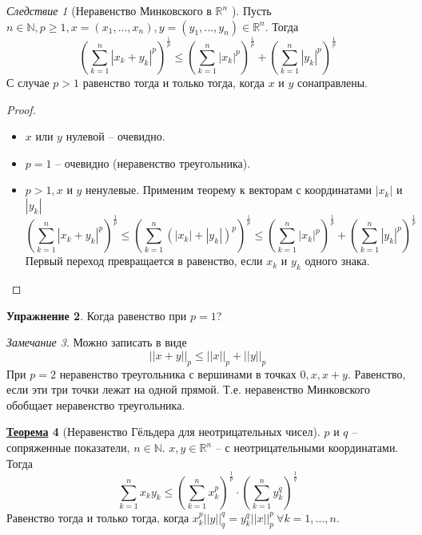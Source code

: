 \documentclass[12pt]{article}
\newenvironment{MyItemize}[1][4pt]{
  \begin{itemize}
  \setlength{\parskip}{0pt}
  \setlength{\itemsep}{#1}
}{       
  \end{itemize}
}
\def\N{\mathbb{N}}       %
\def\R{\mathbb{R}}       %
\theoremstyle{definition} %
\newtheorem{Thm}{\underline{Теорема}}[subsection] %
\newtheorem{Ex}[Thm]{Упражнение} %
\theoremstyle{plain} %
\theoremstyle{remark} %
\newtheorem{Cons}[Thm]{Следствие} %
\newtheorem{Rem}[Thm]{Замечание} %
\begin{document}
\begin{Cons}[Неравенство Минковского в $\R^n$ ]
    Пусть $n \in \N, p \geqslant 1, x = (x_1, ..., x_n), y = (y_1, ..., y_n) \in \R^n$.
    Тогда
    \[\left(\sum_{k=1}^{n} |x_k + y_k|^p\right)^{\frac{1}{p}} \leqslant \left(\sum_{k = 1}^n |x_k|^p\right)^{\frac{1}{p}} + \left(\sum_{k=1}^{n} |y_k|^p\right)^{\frac{1}{p}}\]
    С случае $p > 1$ равенство тогда и только тогда, когда $x$ и $y$ сонаправлены.
\end{Cons}

\begin{proof}
    \begin{MyItemize}
        \item $x$ или $y$ нулевой -- очевидно.
        \item $p = 1$ -- очевидно (неравенство треугольника). 
        \item $p > 1, x$ и $y$ ненулевые.
        Применим теорему к векторам с координатами $|x_k|$ и $|y_k|$ 
        \[\left(\sum_{k = 1}^n |x_k + y_k|^p\right)^{\frac{1}{p}} \leqslant \left(\sum_{k = 1}^n \left(|x_k| + |y_k|\right)^p\right)^{\frac{1}{p}} \leqslant \left(\sum_{k = 1}^n |x_k|^p\right)^{\frac{1}{p}} + \left(\sum_{k = 1}^n |y_k|^p\right)^{\frac{1}{p}}\]
        Первый переход превращается в равенство, если $x_k$ и $y_k$ одного знака.
    \end{MyItemize}
\end{proof}

\begin{Ex}
    Когда равенство при $p = 1$?
\end{Ex}

\begin{Rem}
    Можно записать в виде \[||x + y||_p \leqslant ||x||_p + ||y||_p\]
    При $p = 2$ неравенство треугольника с вершинами в точках $0, x, x + y$.
    Равенство, если эти три точки лежат на одной прямой.
    Т.е. неравенство Минковского обобщает неравенство треугольника.
\end{Rem}

\begin{Thm}[Неравенство Гёльдера для неотрицательных чисел]
    $p$ и $q$ -- сопряженные показатели, $n \in \N$. $x, y \in \R^n$ -- с неотрицательными координатами.
    Тогда 
    \[\sum_{k = 1}^n x_k y_k \leqslant \left(\sum_{k = 1}^n x_k^p\right)^{\frac{1}{p}} \cdot \left(\sum_{k = 1}^n y_k^q\right)^{\frac{1}{q}}\]
    Равенство тогда и только тогда, когда $x_k^p ||y||_q^q = y_k^q ||x||_p^p \ \forall k = 1, ..., n$.
\end{Thm}
\end{document}
